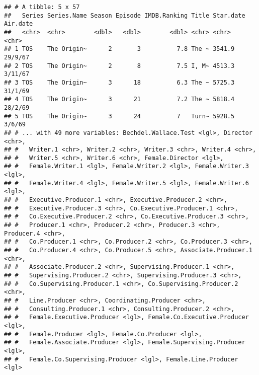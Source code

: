\documentclass[
]{article}
\newenvironment{Shaded}{\begin{snugshade}}{\end{snugshade}}
\newcommand{\KeywordTok}[1]{\textcolor[rgb]{0.13,0.29,0.53}{\textbf{#1}}}
\newcommand{\NormalTok}[1]{#1}
\newcommand{\OperatorTok}[1]{\textcolor[rgb]{0.81,0.36,0.00}{\textbf{#1}}}
\newcommand{\StringTok}[1]{\textcolor[rgb]{0.31,0.60,0.02}{#1}}
\begin{document}
\begin{verbatim}
## # A tibble: 5 x 57
##   Series Series.Name Season Episode IMDB.Ranking Title Star.date Air.date
##   <chr>  <chr>        <dbl>   <dbl>        <dbl> <chr> <chr>     <chr>   
## 1 TOS    The Origin~      2       3          7.8 The ~ 3541.9    29/9/67 
## 2 TOS    The Origin~      2       8          7.5 I, M~ 4513.3    3/11/67 
## 3 TOS    The Origin~      3      18          6.3 The ~ 5725.3    31/1/69 
## 4 TOS    The Origin~      3      21          7.2 The ~ 5818.4    28/2/69 
## 5 TOS    The Origin~      3      24          7   Turn~ 5928.5    3/6/69  
## # ... with 49 more variables: Bechdel.Wallace.Test <lgl>, Director <chr>,
## #   Writer.1 <chr>, Writer.2 <chr>, Writer.3 <chr>, Writer.4 <chr>,
## #   Writer.5 <chr>, Writer.6 <chr>, Female.Director <lgl>,
## #   Female.Writer.1 <lgl>, Female.Writer.2 <lgl>, Female.Writer.3 <lgl>,
## #   Female.Writer.4 <lgl>, Female.Writer.5 <lgl>, Female.Writer.6 <lgl>,
## #   Executive.Producer.1 <chr>, Executive.Producer.2 <chr>,
## #   Executive.Producer.3 <chr>, Co.Executive.Producer.1 <chr>,
## #   Co.Executive.Producer.2 <chr>, Co.Executive.Producer.3 <chr>,
## #   Producer.1 <chr>, Producer.2 <chr>, Producer.3 <chr>, Producer.4 <chr>,
## #   Co.Producer.1 <chr>, Co.Producer.2 <chr>, Co.Producer.3 <chr>,
## #   Co.Producer.4 <chr>, Co.Producer.5 <chr>, Associate.Producer.1 <chr>,
## #   Associate.Producer.2 <chr>, Supervising.Producer.1 <chr>,
## #   Supervising.Producer.2 <chr>, Supervising.Producer.3 <chr>,
## #   Co.Supervising.Producer.1 <chr>, Co.Supervising.Producer.2 <chr>,
## #   Line.Producer <chr>, Coordinating.Producer <chr>,
## #   Consulting.Producer.1 <chr>, Consulting.Producer.2 <chr>,
## #   Female.Executive.Producer <lgl>, Female.Co.Executive.Producer <lgl>,
## #   Female.Producer <lgl>, Female.Co.Producer <lgl>,
## #   Female.Associate.Producer <lgl>, Female.Supervising.Producer <lgl>,
## #   Female.Co.Supervising.Producer <lgl>, Female.Line.Producer <lgl>
\end{verbatim}

\begin{Shaded}
\end{Shaded}
\end{document}

